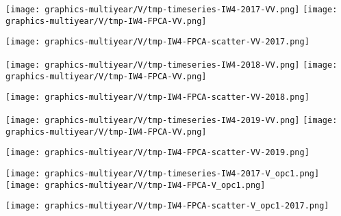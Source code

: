 
\begin{center}
\begin{minipage}{7.0in}
\texttt{[image: graphics-multiyear/V/tmp-timeseries-IW4-2017-VV.png]}
\quad
\texttt{[image: graphics-multiyear/V/tmp-IW4-FPCA-VV.png]}
\vskip 1.0cm
\begin{center}
\texttt{[image: graphics-multiyear/V/tmp-IW4-FPCA-scatter-VV-2017.png]}
\end{center}
\end{minipage}
\end{center}


\begin{center}
\begin{minipage}{7.0in}
\texttt{[image: graphics-multiyear/V/tmp-timeseries-IW4-2018-VV.png]}
\quad
\texttt{[image: graphics-multiyear/V/tmp-IW4-FPCA-VV.png]}
\vskip 1.0cm
\begin{center}
\texttt{[image: graphics-multiyear/V/tmp-IW4-FPCA-scatter-VV-2018.png]}
\end{center}
\end{minipage}
\end{center}


\begin{center}
\begin{minipage}{7.0in}
\texttt{[image: graphics-multiyear/V/tmp-timeseries-IW4-2019-VV.png]}
\quad
\texttt{[image: graphics-multiyear/V/tmp-IW4-FPCA-VV.png]}
\vskip 1.0cm
\begin{center}
\texttt{[image: graphics-multiyear/V/tmp-IW4-FPCA-scatter-VV-2019.png]}
\end{center}
\end{minipage}
\end{center}


\begin{center}
\begin{minipage}{7.0in}
\texttt{[image: graphics-multiyear/V/tmp-timeseries-IW4-2017-V\_opc1.png]}
\quad
\texttt{[image: graphics-multiyear/V/tmp-IW4-FPCA-V\_opc1.png]}
\vskip 1.0cm
\begin{center}
\texttt{[image: graphics-multiyear/V/tmp-IW4-FPCA-scatter-V\_opc1-2017.png]}
\end{center}
\end{minipage}
\end{center}

